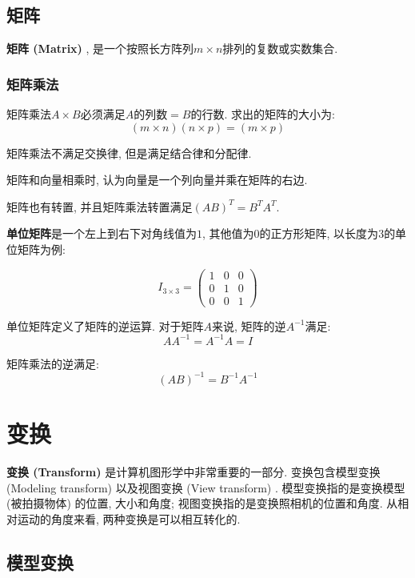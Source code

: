 \section{矩阵}

\textbf{矩阵 (Matrix) }, 是一个按照长方阵列$m\times n$排列的复数或实数集合. 

\subsection{矩阵乘法}

矩阵乘法$A\times B$必须满足$A$的列数$=B$的行数. 求出的矩阵的大小为: 
\begin{equation}
	(m\times n)(n\times p) = (m\times p)
\end{equation}

矩阵乘法不满足交换律, 但是满足结合律和分配律. 

矩阵和向量相乘时, 认为向量是一个列向量并乘在矩阵的右边. 

矩阵也有转置, 并且矩阵乘法转置满足$(AB)^T=B^TA^T$.

\textbf{单位矩阵}是一个左上到右下对角线值为$1$, 其他值为$0$的正方形矩阵, 以长度为$3$的单位矩阵为例: 

\begin{equation}
	I_{3\times 3}=\begin{pmatrix}
		1&0&0\\
		0&1&0\\
		0&0&1
	\end{pmatrix}
\end{equation}

单位矩阵定义了矩阵的逆运算. 对于矩阵$A$来说, 矩阵的逆$A^{-1}$满足: 
\begin{equation}
	AA^{-1}=A^{-1}A=I
\end{equation}

矩阵乘法的逆满足: 
\begin{equation}
	(AB)^{-1}=B^{-1}A^{-1}
\end{equation}

\chapter{变换}

\textbf{变换 (Transform) }是计算机图形学中非常重要的一部分. 变换包含模型变换 (Modeling transform) 以及视图变换 (View transform) . 模型变换指的是变换模型 (被拍摄物体) 的位置, 大小和角度; 视图变换指的是变换照相机的位置和角度. 从相对运动的角度来看, 两种变换是可以相互转化的. 

\section{模型变换}


